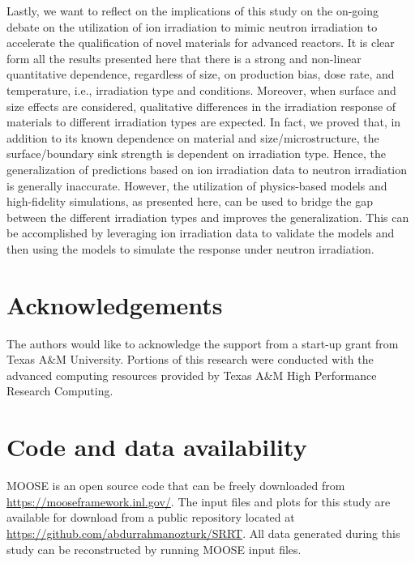 \documentclass[utf8]{frontiersSCNS} %
\begin{document}
Lastly, we want to reflect on the implications of this study on the on-going debate on the utilization of ion irradiation to mimic neutron irradiation to accelerate the qualification of novel materials for advanced reactors. It is clear form all the results presented here that there is a strong and non-linear quantitative dependence, regardless of size, on production bias, dose rate, and temperature, i.e., irradiation type and conditions. Moreover, when surface and size effects are considered, qualitative differences in the irradiation response of materials to different irradiation types are expected. In fact, we proved that, in addition to its known dependence on material and size/microstructure, the surface/boundary sink strength is dependent on irradiation type. Hence, the generalization of predictions based on ion irradiation data to neutron irradiation is generally inaccurate. However, the utilization of physics-based models and high-fidelity simulations, as presented here, can be used to bridge the gap between the different irradiation types and improves the generalization. This can be accomplished by leveraging ion irradiation data to validate the models and then using the models to simulate the response under neutron irradiation.
         

\section*{Acknowledgements}
 
The authors would like to acknowledge the support from a start-up grant from Texas A\&M University. Portions of this research were conducted with the advanced computing resources provided by Texas A\&M High Performance Research Computing.         

\section*{Code and data availability}

MOOSE is an open source code that can be freely downloaded from \href{https://mooseframework.inl.gov/}{https://mooseframework.inl.gov/}. The input files and plots for this study are available for download from a public repository located at
\href{https://github.com/abdurrahmanozturk/SRRT}{https://github.com/abdurrahmanozturk/SRRT}. All data generated during this study can be reconstructed by running MOOSE input files.
\clearpage


\end{document}
